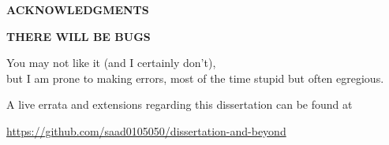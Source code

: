 \thispagestyle{plain}

\begin{center}
{\large\bf ACKNOWLEDGMENTS}
\end{center}

{\singlespacing

}
\newpage


\thispagestyle{plain}

\begin{center}
{\large\bf THERE WILL BE BUGS}
\vspace{1in}
\end{center}




\begin{center}
You may not like it (and I certainly don't), \\
but I am prone to making errors, 
most of the time stupid but often egregious. 

A live errata and extensions regarding this dissertation 
can be found at 

  \url{https://github.com/saad0105050/dissertation-and-beyond}
\end{center}

\newpage
